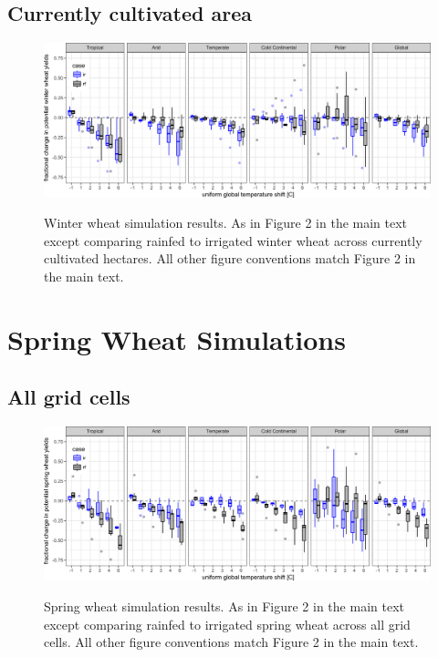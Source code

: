 \documentclass[10pt]{article}
\begin{document}
\subsection{Currently cultivated area}
\begin{figure}[h!]
\includegraphics[width=\textwidth]{s_winter_wheat_sim_CG_area_weight.png}\\
\caption{Winter wheat simulation results. As in Figure 2 in the main text except comparing rainfed to irrigated winter wheat across currently cultivated hectares. All other figure conventions match Figure 2 in the main text.}
\label{fig:maizeCG}
\end{figure}

\clearpage
\section{Spring Wheat Simulations}
\subsection{All grid cells}
\begin{figure}[h!]
\includegraphics[width=\textwidth]{s_spring_wheat_sim_CG.png}\\
\caption{Spring wheat simulation results. As in Figure 2 in the main text except comparing rainfed to irrigated spring wheat across all grid cells. All other figure conventions match Figure 2 in the main text.}
\label{fig:maizeCG}
\end{figure}
\end{document}
